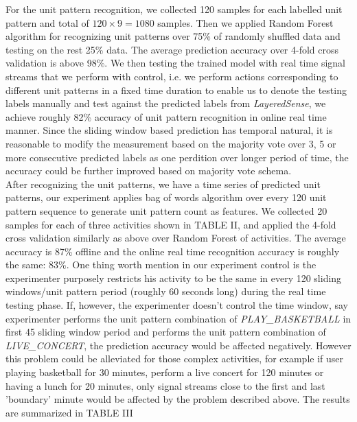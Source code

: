 \documentclass[a4paper, 10pt, conference]{IEEEtran}      %
\begin{document}
For the unit pattern recognition, we collected 120 samples for each labelled unit pattern and total of $120 \times 9 = 1080 $ samples. Then we applied Random Forest algorithm for recognizing unit patterns over 75\% of randomly shuffled data and testing on the rest 25\% data. The average prediction accuracy over 4-fold cross validation is above 98\%. We then testing the trained model with real time signal streams that we perform with control, i.e. we perform actions corresponding to different unit patterns in a fixed time duration to enable us to denote the testing labels manually and test against the predicted labels from \emph{LayeredSense}, we achieve roughly 82\% accuracy of unit pattern recognition in online real time manner. Since the sliding window based prediction has temporal natural, it is reasonable to modify the measurement based on the majority vote over 3, 5 or more consecutive predicted labels as one perdition over longer period of time, the accuracy could be further improved based on majority vote schema. \\

After recognizing the unit patterns, we have a time series of predicted unit patterns, our experiment applies bag of words algorithm over every 120 unit pattern sequence to generate unit pattern count as features. We collected 20 samples for each of three activities shown in TABLE II, and applied the 4-fold cross validation similarly as above over Random Forest of activities. The average accuracy is 87\% offline and the online real time recognition accuracy is roughly the same: 83\%. One thing worth mention in our experiment control is the experimenter purposely restricts his activity to be the same in every 120 sliding windows/unit pattern period (roughly 60 seconds long) during the real time testing phase. If, however, the experimenter doesn't control the time window, say experimenter performs the unit pattern combination of \emph{PLAY\_BASKETBALL} in first 45 sliding window period and performs the unit pattern combination of \emph{LIVE\_CONCERT}, the prediction accuracy would be affected negatively. However this problem could be alleviated for those complex activities, for example if user playing basketball for 30 minutes, perform a live concert for 120 minutes or having a lunch for 20 minutes, only signal streams close to the first and last 'boundary' minute would be affected by the problem described above. The results are summarized in TABLE III   
\end{document}
